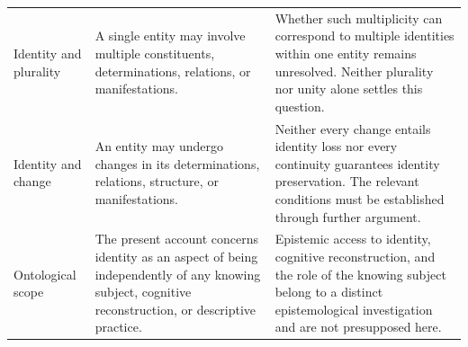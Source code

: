 \begin{table}[htbp]
\begin{tabular}{p{3.3cm} p{5.0cm} p{5.3cm}}
        Identity and plurality &
        A single entity may involve multiple constituents, determinations, relations, or manifestations. &
        Whether such multiplicity can correspond to multiple identities within one entity remains unresolved. Neither plurality nor unity alone settles this question. \\

        Identity and change &
        An entity may undergo changes in its determinations, relations, structure, or manifestations. &
        Neither every change entails identity loss nor every continuity guarantees identity preservation. The relevant conditions must be established through further argument. \\

        Ontological scope &
        The present account concerns identity as an aspect of being independently of any knowing subject, cognitive reconstruction, or descriptive practice. &
        Epistemic access to identity, cognitive reconstruction, and the role of the knowing subject belong to a distinct epistemological investigation and are not presupposed here. \\

        \hline
    \end{tabular}
\end{table}

